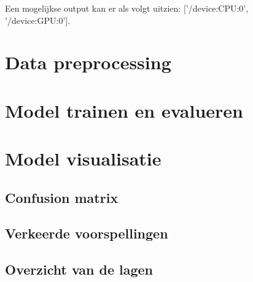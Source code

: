 Een mogelijkse output kan er als volgt uitzien: ['/device:CPU:0', '/device:GPU:0'].

\section{Data preprocessing}
\label{sec:preprocessing-autokeras}

\section{Model trainen en evalueren}
\label{sec:traineval-autokeras}

\section{Model visualisatie}
\label{sec:vis-autokeras}

\subsection{Confusion matrix}
\subsection{Verkeerde voorspellingen}

\subsection{Overzicht van de lagen}
\label{subsec:model-overview}

